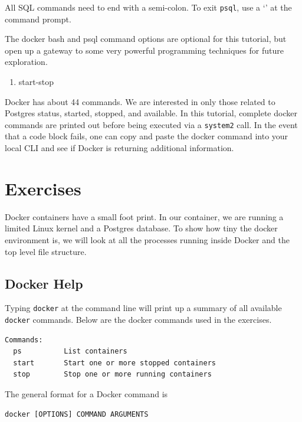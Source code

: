 \documentclass[]{book}
\providecommand{\tightlist}{%
  \setlength{\itemsep}{0pt}\setlength{\parskip}{0pt}}
\theoremstyle{definition}
\theoremstyle{definition}
\theoremstyle{definition}
\theoremstyle{remark}
\begin{document}
All SQL commands need to end with a semi-colon. To exit \texttt{psql},
use a `\q' at the command prompt.

The docker bash and psql command options are optional for this tutorial,
but open up a gateway to some very powerful programming techniques for
future exploration.

\begin{enumerate}
\def\labelenumi{\arabic{enumi}.}
\setcounter{enumi}{3}
\tightlist
\item
  start-stop
\end{enumerate}

Docker has about 44 commands. We are interested in only those related to
Postgres status, started, stopped, and available. In this tutorial,
complete docker commands are printed out before being executed via a
\texttt{system2} call. In the event that a code block fails, one can
copy and paste the docker command into your local CLI and see if Docker
is returning additional information.

\hypertarget{exercises}{%
\section{Exercises}\label{exercises}}

Docker containers have a small foot print. In our container, we are
running a limited Linux kernel and a Postgres database. To show how tiny
the docker environment is, we will look at all the processes running
inside Docker and the top level file structure.

\hypertarget{docker-help}{%
\subsection{Docker Help}\label{docker-help}}

Typing \texttt{docker} at the command line will print up a summary of
all available \texttt{docker} commands. Below are the docker commands
used in the exercises.

\begin{verbatim}
Commands:
  ps          List containers
  start       Start one or more stopped containers
  stop        Stop one or more running containers
\end{verbatim}

The general format for a Docker command is

\begin{verbatim}
docker [OPTIONS] COMMAND ARGUMENTS
\end{verbatim}
\end{document}
